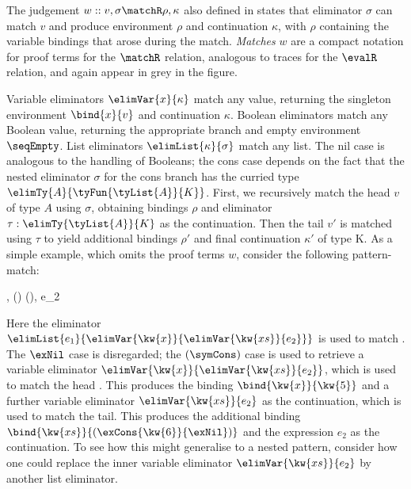 The judgement $w :: v, \sigma \matchR \rho, \kappa$ also defined in  states that eliminator $\sigma$ can match $v$ and produce environment $\rho$ and continuation $\kappa$, with $\rho$ containing the variable bindings that arose during the match. \emph{Matches} $w$ are a compact notation for proof terms for the $\matchR$ relation, analogous to traces for the $\evalR$ relation, and again appear in grey in the figure.

Variable eliminators $\elimVar{x}{\kappa}$ match any value, returning the singleton environment $\bind{x}{v}$ and continuation $\kappa$. Boolean eliminators match any Boolean value, returning the appropriate branch and empty environment $\seqEmpty$. List eliminators $\elimList{\kappa}{\sigma}$ match any list. The nil case is analogous to the handling of Booleans; the cons case depends on the fact that the nested eliminator $\sigma$ for the cons branch has the curried type $\elimTy{A}{\tyFun{\tyList{A}}{K}}$. First, we recursively match the head $v$ of type $A$ using $\sigma$, obtaining bindings $\rho$ and eliminator $\tau: \elimTy{\tyList{A}}{K}$ as the continuation. Then the tail $v'$ is matched using $\tau$ to yield additional bindings $\rho'$ and final continuation $\kappa'$ of type K. As a simple example, which omits the proof terms $w$, consider the following pattern-match:

\begin{smathpar}
   {
         , 
         \matchR
         () \concat (), e_2
   }
\end{smathpar}

\noindent Here the eliminator $\elimList{e_1}{\elimVar{\kw{x}}{\elimVar{\kw{xs}}{e_2}}}$ is used to match . The $\exNil$ case is disregarded; the $(\symCons)$ case is used to retrieve a variable eliminator $\elimVar{\kw{x}}{\elimVar{\kw{xs}}{e_2}}$, which is used to match the head . This produces the binding $\bind{\kw{x}}{\kw{5}}$ and a further variable eliminator $\elimVar{\kw{xs}}{e_2}$ as the continuation, which is used to match the tail. This produces the additional binding $\bind{\kw{xs}}{(\exCons{\kw{6}}{\exNil})}$ and the expression $e_2$ as the continuation. To see how this might generalise to a nested pattern, consider how one could replace the inner variable eliminator $\elimVar{\kw{xs}}{e_2}$ by another list eliminator.

